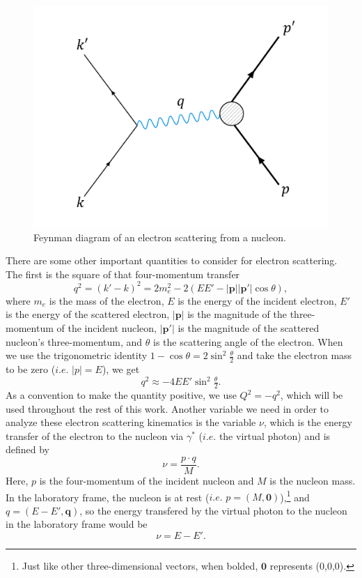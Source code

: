\begin{figure}[h!]
	\centering
	\includegraphics[width=0.6\linewidth]{figures/feyn_epscatt.png}
	\caption{Feynman diagram of an electron scattering from a nucleon.}
	\label{fig:feyn_epscatt}
\end{figure}

There are some other important quantities to consider for electron scattering. The first is the square of that four-momentum transfer
\begin{equation}
q^2 = (k' - k)^2 = 2m_e^2 - 2(EE' - |\mathbf{p}||\mathbf{p}'| \cos \theta),
\end{equation}
where $m_e$ is the mass of the electron, $E$ is the energy of the incident electron, $E'$ is the energy of the scattered electron, $|\mathbf{p}|$ is the magnitude of the three-momentum of the incident nucleon, $|\mathbf{p}'|$ is the magnitude of the scattered nucleon's three-momentum, and $\theta$ is the scattering angle of the electron. When we use the trigonometric identity $1-\cos \theta = 2 \sin^2 \tfrac{\theta}{2}$ and take the electron mass to be zero ($i.e.$ $|p| = E$), we get
\begin{equation}
q^2 \approx -4EE'\sin^2\tfrac{\theta}{2}.
\end{equation}
As a convention to make the quantity positive, we use $Q^2 = -q^2$, which will be used throughout the rest of this work. Another variable we need in order to analyze these electron scattering kinematics is the variable $\nu$, which is the energy transfer of the electron to the nucleon via $\gamma^*$ ($i.e.$ the virtual photon) and is defined by
\begin{equation}
\nu = \frac{p \cdot q}{M}.
\end{equation}
Here, $p$ is the four-momentum of the incident nucleon and $M$ is the nucleon mass. In the laboratory frame, the nucleon is at rest ($i.e.$ $p=(M,\mathbf{0})$),\footnote{Just like other three-dimensional vectors, when bolded, $\mathbf{0}$ represents (0,0,0).} and $q=(E-E',\mathbf{q})$, so the energy transfered by the virtual photon to the nucleon in the laboratory frame would be
\begin{equation}
\nu  = E-E'.
\end{equation}

